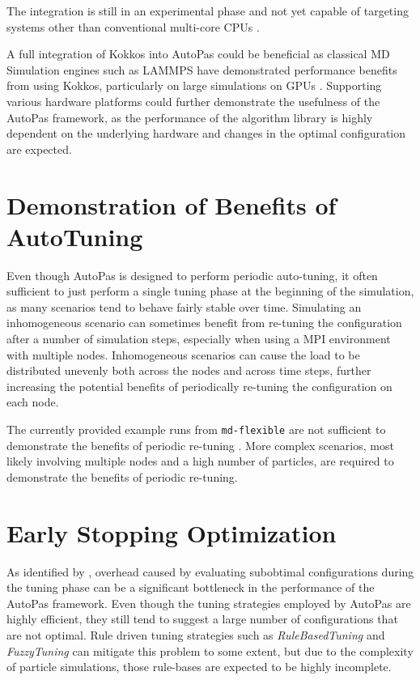 \documentclass[conference]{IEEEtran}
\begin{document}
The integration is still in an experimental phase and not yet capable of targeting systems other than conventional multi-core CPUs \cite{Gärtner_KokkosInAutoPas.pdf}.

A full integration of Kokkos into AutoPas could be beneficial as classical MD Simulation engines such as LAMMPS have demonstrated performance benefits from using Kokkos, particularly on large simulations on GPUs \cite{lammps_kokkos}. Supporting various hardware platforms could further demonstrate the usefulness of the AutoPas framework, as the performance of the algorithm library is highly dependent on the underlying hardware \cite{SECKLER2021101296} and changes in the optimal configuration are expected.

\section{Demonstration of Benefits of AutoTuning}

Even though AutoPas is designed to perform periodic auto-tuning, it often sufficient to just perform a single tuning phase at the beginning of the simulation, as many scenarios tend to behave fairly stable over time.
Simulating an inhomogeneous scenario can sometimes benefit from re-tuning the configuration after a number of simulation steps, especially when using a MPI environment with multiple nodes. Inhomogeneous scenarios can cause the load to be distributed unevenly both across the nodes and across time steps, further increasing the potential benefits of periodically re-tuning the configuration on each node.

The currently provided example runs from \texttt{md-flexible} are not sufficient to demonstrate the benefits of periodic re-tuning . More complex scenarios, most likely involving multiple nodes and a high number of particles, are required to demonstrate the benefits of periodic re-tuning.

\newpage
\newpage


\section{Early Stopping Optimization}

As identified by \cite{autopas_issue673}\cite{endreport.pdf}\cite{Manuel_Lerchner_Thesis.pdf}, overhead caused by evaluating subobtimal configurations during the tuning phase can be a significant bottleneck in the performance of the AutoPas framework. Even though the tuning strategies employed by AutoPas are highly efficient, they still tend to suggest a large number of configurations that are not optimal. Rule driven tuning strategies such as \textit{RuleBasedTuning} and \textit{FuzzyTuning} can mitigate this problem to some extent, but due to the complexity of particle simulations, those rule-bases are expected to be highly incomplete.
\end{document}
